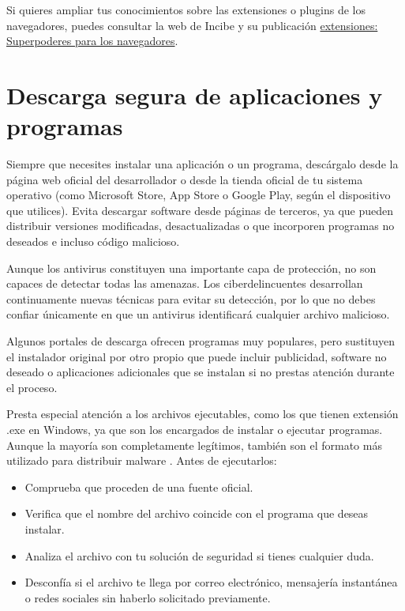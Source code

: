 \documentclass[
  spanish,
  a4paper,
  openany]{book}
\begin{document}
Si quieres ampliar tus conocimientos sobre las extensiones o plugins de los navegadores, puedes consultar la web de Incibe y su publicación \href{https://www.osi.es/es/actualidad/blog/2019/11/20/extensiones-superpoderes-para-los-navegadores}{extensiones: Superpoderes para los navegadores}.

\section{Descarga segura de aplicaciones y programas}\label{descarga-segura-de-aplicaciones-y-programas}

Siempre que necesites instalar una aplicación o un programa, descárgalo desde la página web oficial del desarrollador o desde la tienda oficial de tu sistema operativo (como Microsoft Store, App Store o Google Play, según el dispositivo que utilices). Evita descargar software desde páginas de terceros, ya que pueden distribuir versiones modificadas, desactualizadas o que incorporen programas no deseados e incluso código malicioso.

Aunque los antivirus constituyen una importante capa de protección, no son capaces de detectar todas las amenazas. Los ciberdelincuentes desarrollan continuamente nuevas técnicas para evitar su detección, por lo que no debes confiar únicamente en que un antivirus identificará cualquier archivo malicioso.

Algunos portales de descarga ofrecen programas muy populares, pero sustituyen el instalador original por otro propio que puede incluir publicidad, software no deseado o aplicaciones adicionales que se instalan si no prestas atención durante el proceso.

Presta especial atención a los archivos ejecutables, como los que tienen extensión .exe en Windows, ya que son los encargados de instalar o ejecutar programas. Aunque la mayoría son completamente legítimos, también son el formato más utilizado para distribuir malware \citep{RZ-exe}. Antes de ejecutarlos:

\begin{itemize}
\item
  Comprueba que proceden de una fuente oficial.
\item
  Verifica que el nombre del archivo coincide con el programa que deseas instalar.
\item
  Analiza el archivo con tu solución de seguridad si tienes cualquier duda.
\item
  Desconfía si el archivo te llega por correo electrónico, mensajería instantánea o redes sociales sin haberlo solicitado previamente.
\end{itemize}
\end{document}
